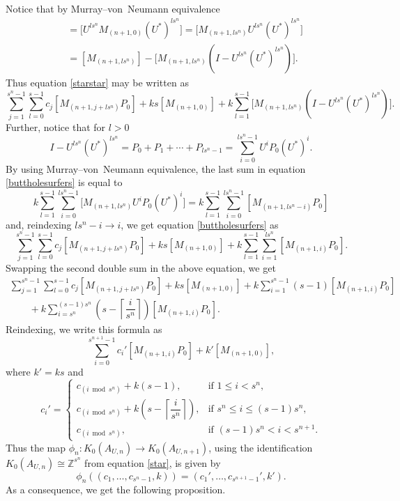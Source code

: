 \documentclass[10pt,a4paper]{amsart}
\newcommand{\Z}{{\mathbb Z}}
\numberwithin{equation}{section}
\begin{document}
Notice that by Murray--von~Neumann equivalence	
\begin{align*}
[M_{(n+1,0)}] &= \big[U^{ls^n} M_{(n+1,0)} (U^*)^{ls^n}\big] = \big[M_{(n+1,ls^n)} U^{ls^n}(U^*)^{ls^n}\big] \\
&= [M_{(n+1,ls^n)} ] - \big[M_{(n+1,ls^n)}(I-U^{ls^n}(U^*)^{ls^n})\big].
\end{align*}
Thus equation \eqref{starstar} may be written as
\begin{equation}\label{buttholesurfers}
\sum_{j=1}^{s^n-1} \sum_{l=0}^{s-1} c_j [M_{(n+1,j+ls^n)} P_0] + ks[M_{(n+1,0)}] + k \sum_{l=1}^{s-1} \big[M_{(n+1,ls^n)}(I-U^{ls^n}(U^*)^{ls^n})\big].
\end{equation}
Further, notice that for $l>0$
\begin{equation*}
I-U^{ls^n}(U^*)^{ls^n} = P_0 + P_1 + \cdots + P_{ls^n-1}= \sum_{i=0}^{ls^n-1} U^i P_0 (U^*)^i.
\end{equation*}
By using Murray--von~Neumann equivalence, the last sum in equation \eqref{buttholesurfers} is equal to
\begin{equation*}
k\sum_{l=1}^{s-1} \sum_{i=0}^{ls^n-1}\big[M_{(n+1,ls^n)}U^i P_0 (U^*)^i\big]
=k\sum_{l=1}^{s-1} \sum_{i=0}^{ls^n-1}[M_{(n+1,ls^n-i)}P_0]
\end{equation*}
and, reindexing $ls^n-i \to i$, we get equation \eqref{buttholesurfers} as
\begin{equation*}
\sum_{j=1}^{s^n-1} \sum_{l=0}^{s-1} c_j[M_{(n+1,j+ls^n)}P_0] + ks[M_{(n+1,0)}] + k\sum_{l=1}^{s-1} \sum_{i=1}^{ls^n} [M_{(n+1,i)}P_0].
\end{equation*}
Swapping the second double sum in the above equation, we get
\begin{gather*}
\sum_{j=1}^{s^n-1} \sum_{l=0}^{s-1} c_j[M_{(n+1,j+ls^n)}P_0] + ks[M_{(n+1,0)}] + k\sum_{i=1}^{s^n-1} (s-1)[M_{(n+1,i)}P_0]\\
\qquad{} +k\sum_{i=s^n}^{(s-1)s^n} \left(s-\left\lceil\dfrac{i}{s^n}\right\rceil\right) [M_{(n+1,i)}P_0].
\end{gather*}
Reindexing, we write this formula as
\begin{equation*}
\sum_{i=0}^{s^{n+1}-1} c_i'[M_{(n+1,i)}P_0] + k' [M_{(n+1,0)}],
\end{equation*}
where $k'=ks$ and
\begin{equation}\label{coeffs}
c_i' = \begin{cases}
c_{(i\bmod s^n)} + k(s-1), & \text{if } 1\le i < s^n, \\
c_{(i \bmod s^n)} + k\left(s-\left\lceil \dfrac{i}{s^n} \right\rceil\right), & \text{if }s^n \leq i \leq (s-1)s^n ,\\ c_{(i\bmod s^n)}, & \text{if } (s-1)s^n < i < s^{n+1}.
\end{cases}
\end{equation}
Thus the map $\phi_n \colon K_0(A_{U,n}) \to K_0(A_{U,n+1})$, using the identification $K_0(A_{U,n})\cong \Z^{s^n}$ from equation \eqref{star}, is given by
\begin{equation*}
\phi_n((c_1,\dots,c_{s^n-1},k)) = (c_1',\dots,c_{s^{n+1}-1}',k').
\end{equation*}
As a consequence, we get the following proposition.
\end{document}
